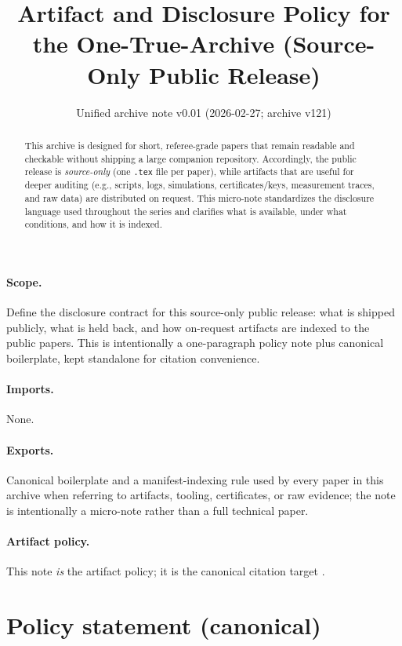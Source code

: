 \documentclass[11pt]{article}
\title{Artifact and Disclosure Policy for the One-True-Archive (Source-Only Public Release)}
\author{}
\date{Unified archive note v0.01 (2026-02-27; archive v121)}
\begin{document}
\maketitle

\begin{abstract}
This archive is designed for short, referee-grade papers that remain readable and checkable without shipping a large companion repository.
Accordingly, the public release is \emph{source-only} (one \texttt{.tex} file per paper), while artifacts that are useful for deeper auditing
(e.g., scripts, logs, simulations, certificates/keys, measurement traces, and raw data) are distributed on request.
This micro-note standardizes the disclosure language used throughout the series and clarifies what is available, under what conditions, and how it is indexed.
\end{abstract}

\paragraph{Scope.}
Define the disclosure contract for this source-only public release: what is shipped publicly, what is held back, and how on-request artifacts are indexed to the public papers. This is intentionally a one-paragraph policy note plus canonical boilerplate, kept standalone for citation convenience.

\paragraph{Imports.}
None.

\paragraph{Exports.}
Canonical boilerplate and a manifest-indexing rule used by every paper in this archive when referring to artifacts, tooling, certificates, or raw evidence; the note is intentionally a micro-note rather than a full technical paper.

\paragraph{Artifact policy.}
This note \emph{is} the artifact policy; it is the canonical citation target \cite{series:artifactpolicy}.



\section{Policy statement (canonical)}
\end{document}
